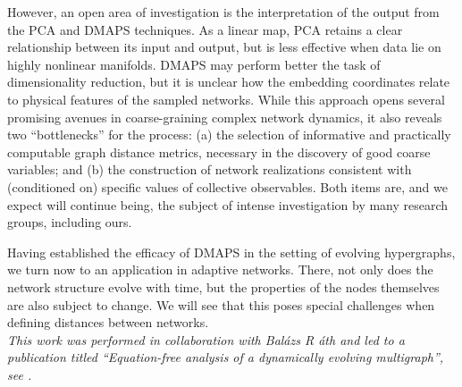   However, an open area of investigation is the interpretation of the
  output from the PCA and DMAPS techniques.
  As a linear map, PCA retains a clear relationship between its input
  and output, but is less effective when data lie on highly nonlinear
  manifolds.
  DMAPS may perform better the task of dimensionality reduction, but
  it is unclear how the embedding coordinates relate to physical
  features of the sampled networks.
  While this approach opens several promising avenues in
  coarse-graining complex network dynamics, it also reveals two
  ``bottlenecks'' for the process: (a) the selection of informative
  and practically computable graph distance metrics, necessary in the
  discovery of good coarse variables; and (b) the construction of
  network realizations consistent with (conditioned on) specific
  values of collective observables.
  Both items are, and we expect will continue being, the subject of
  intense investigation by many research groups, including ours.

  Having established the efficacy of DMAPS in the setting of evolving
  hypergraphs, we turn now to an application in adaptive
  networks. There, not only does the network structure evolve with time,
  but the properties of the nodes themselves are also subject to
  change. We will see that this poses special challenges when defining
  distances between networks. \\
  
  \textit{This work was performed in collaboration with Bal\'{a}zs R
    \'{a}th and led to a publication titled ``Equation-free analysis
    of a dynamically evolving multigraph'', see
    \cite{holiday_equation-free_2016}.}

